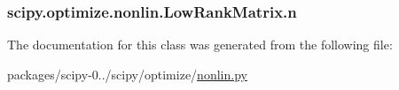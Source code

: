 \subsubsection[{n}]{\setlength{\rightskip}{0pt plus 5cm}scipy.\+optimize.\+nonlin.\+Low\+Rank\+Matrix.\+n}\label{classscipy_1_1optimize_1_1nonlin_1_1LowRankMatrix_a93fb49280cac689e26ae1e1d79da5325}


The documentation for this class was generated from the following file\+:\begin{DoxyCompactItemize}
\item 
packages/scipy-\/0../scipy/optimize/\hyperlink{nonlin_8py}{nonlin.\+py}\end{DoxyCompactItemize}
